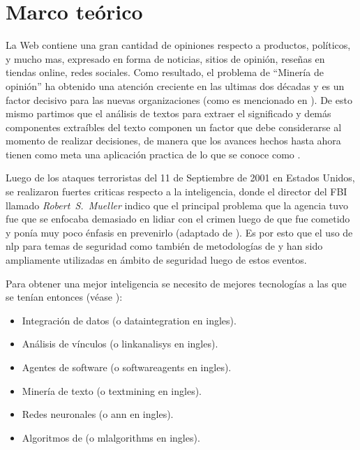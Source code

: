 \chapter{Marco teórico} %

\label{ch:MarcoTeorico} %



La Web contiene una gran cantidad de opiniones respecto a productos, políticos, y mucho mas, expresado en forma de noticias, sitios de opinión, reseñas en tiendas online, redes sociales. Como resultado, el problema de ``Minería de opinión'' ha obtenido una atención creciente en las ultimas dos décadas y es un factor decisivo para las nuevas organizaciones (como es mencionado en \cite{Popescu2007}). De esto mismo partimos que el análisis de textos para extraer el significado y demás componentes extraíbles del texto componen un factor que debe considerarse al momento de realizar decisiones, de manera que los avances hechos hasta ahora tienen como meta una aplicación practica de lo que se conoce como .

Luego de los ataques terroristas del 11 de Septiembre de 2001 en Estados Unidos, se realizaron fuertes criticas respecto a la inteligencia, donde el director del FBI llamado \mbox{\emph{Robert~S.~Mueller}} indico que el principal problema que la agencia tuvo fue que se enfocaba demasiado en lidiar con el crimen luego de que fue cometido y ponía muy poco énfasis en prevenirlo (adaptado de \cite{mena2003investigative}). Es por esto que el uso de \gls{nlp} para temas de seguridad como también de metodologías de  y  han sido ampliamente utilizadas en ámbito de seguridad luego de estos eventos.

Para obtener una mejor inteligencia se necesito de mejores tecnologías a las que se tenían entonces (véase \cite[p\'ag 2]{mena2003investigative}):
\begin{itemize}
\item Integración de datos (o \gls{dataintegration} en ingles).
\item Análisis de vínculos (o \gls{linkanalisys} en ingles).
\item Agentes de software (o \gls{softwareagents} en ingles).
\item Minería de texto (o \gls{textmining} en ingles).
\item Redes neuronales (o \gls{ann} en ingles).
\item Algoritmos de  (o \gls{mlalgorithms} en ingles).
\end{itemize}


